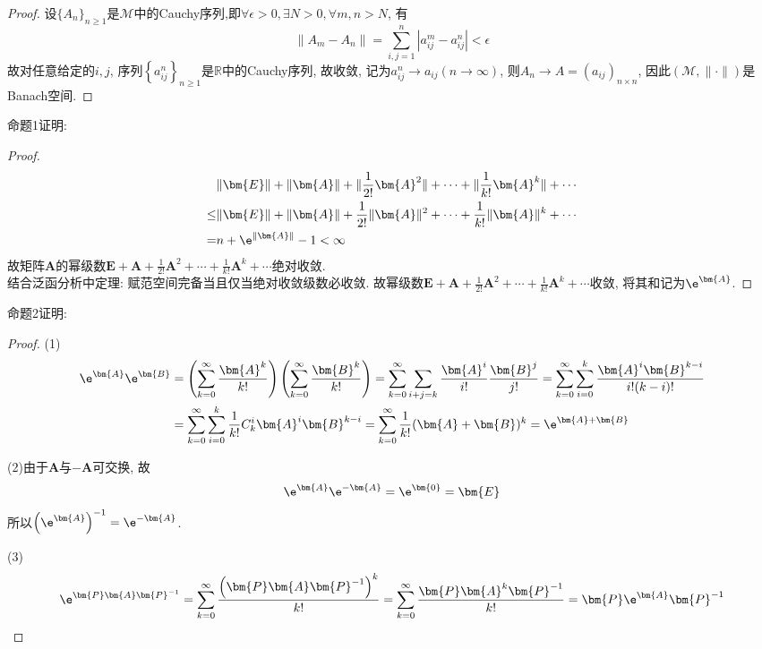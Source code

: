 \begin{proof}
设$\{A_n\}_{n\geq1}$是$\mathcal{M}$中的Cauchy序列,即$\forall\epsilon>0,\exists N>0,\forall m,n>N$, 有
\[\|A_m-A_n\|=\sum_{i,j=1}^n|a_{ij}^m-a_{ij}^n|<\epsilon\]
故对任意给定的$i,j$, 序列$\left\{a_{ij}^n\right\}_{n\geq1}$是$\mathbb{R}$中的Cauchy序列, 故收敛, 记为$a_{ij}^n\to a_{ij}(n\to\infty)$, 则$A_n\to A=(a_{ij})_{n\times n}$, 因此$(\mathcal{M},\|\cdot\|)$是Banach空间.
\end{proof}

命题1证明:

\begin{proof}
\[\begin{split}
&\|\bm{E}\|+\|\bm{A}\|+\|\frac{1}{2!}\bm{A}^2\|+\cdots+\|\frac{1}{k!}\bm{A}^k\|+\cdots\\
\leq&\|\bm{E}\|+\|\bm{A}\|+\frac{1}{2!}\|\bm{A}\|^2+\cdots+\frac{1}{k!}\|\bm{A}\|^k+\cdots\\
=&n+\e^{\|\bm{A}\|}-1<\infty
\end{split}\]
故矩阵$\bm{A}$的幂级数$\displaystyle\bm{E}+\bm{A}+\frac{1}{2!}\bm{A}^2+\cdots+\frac{1}{k!}\bm{A}^k+\cdots$绝对收敛.\\
结合泛函分析中定理: 赋范空间完备当且仅当绝对收敛级数必收敛. 
故幂级数$\displaystyle\bm{E}+\bm{A}+\frac{1}{2!}\bm{A}^2+\cdots+\frac{1}{k!}\bm{A}^k+\cdots$收敛, 将其和记为$\e^{\bm{A}}$.
\end{proof}

命题2证明:

\begin{proof}
(1)\[\begin{split}
\e^{\bm{A}}\e^{\bm{B}}&=\left(\sum_{k=0}^{\infty}\frac{\bm{A}^k}{k!}\right)\left(\sum_{k=0}^{\infty}\frac{\bm{B}^k}{k!}\right)=\sum_{k=0}^{\infty}\sum_{i+j=k}\frac{\bm{A}^i}{i!}\frac{\bm{B}^j}{j!}=\sum_{k=0}^{\infty}\sum_{i=0}^k\frac{\bm{A}^i\bm{B}^{k-i}}{i!(k-i)!}\\
&=\sum_{k=0}^{\infty}\sum_{i=0}^k\frac{1}{k!}C_k^i\bm{A}^i\bm{B}^{k-i}=\sum_{k=0}^{\infty}\frac{1}{k!}(\bm{A}+\bm{B})^k=\e^{\bm{A}+\bm{B}}
\end{split}\]

(2)由于$\bm{A}$与$-\bm{A}$可交换, 故
\[\e^{\bm{A}}\e^{-\bm{A}}=\e^{\bm{0}}=\bm{E}\]
所以$\left(\e^{\bm{A}}\right)^{-1}=\e^{-\bm{A}}$.

(3)\[\e^{\bm{P}\bm{A}\bm{P}^{-1}}=\sum_{k=0}^{\infty}\frac{\left(\bm{P}\bm{A}\bm{P}^{-1}\right)^k}{k!}=\sum_{k=0}^{\infty}\frac{\bm{P}\bm{A}^k\bm{P}^{-1}}{k!}=\bm{P}\e^{\bm{A}}\bm{P}^{-1}\qedhere\]
\end{proof}


